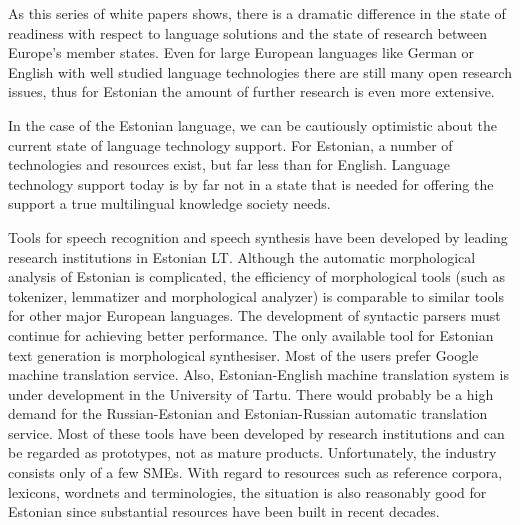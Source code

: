 \documentclass[]{../metanetpaper}
\begin{document}
\begin{multicols}{2}

As this series of white papers shows, there is a dramatic difference in the state of readiness with respect to language solutions and the state of research between Europe’s member states. Even for large European languages like German or English with well studied language technologies there are still many open research issues, thus for Estonian the amount of further research is even more extensive. 

In the case of the Estonian language, we can be cautiously optimistic about the current state of language technology support. 
For Estonian, a number of technologies and resources exist, but far less than for English. 
Language technology support today is by far not in a state that is needed for offering the support a true multilingual knowledge society needs.

Tools for speech recognition and speech synthesis have been developed by leading research institutions in Estonian LT.
Although the automatic morphological analysis of Estonian is complicated, the efficiency of morphological tools (such as tokenizer, lemmatizer and morphological analyzer) is comparable to similar tools for other major European languages. 
The development of syntactic parsers must continue for achieving better performance.
The only available tool for Estonian text generation is morphological synthesiser.
Most of the users prefer Google machine translation service. Also, Estonian-English machine translation system is under development in the University of Tartu. There would probably be a high demand for the Russian-Estonian and Estonian-Russian automatic translation service.
Most of these tools have been developed by research institutions and can be regarded as prototypes, not as mature products. Unfortunately, the industry consists only of a few SMEs.
With regard to resources such as reference corpora, lexicons, wordnets and terminologies, the situation is also reasonably good for Estonian since substantial resources have been built in recent decades. 



\end{multicols}
\end{document}
